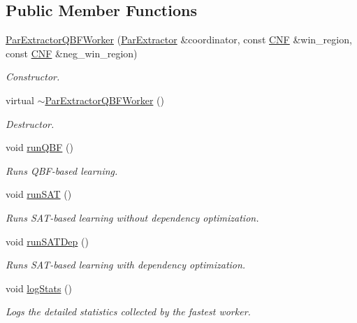 \subsection*{Public Member Functions}
\begin{DoxyCompactItemize}
\item 
\hyperlink{classParExtractorQBFWorker_a057b1cbecd64f78b61ef5fdcab78db68}{Par\-Extractor\-Q\-B\-F\-Worker} (\hyperlink{classParExtractor}{Par\-Extractor} \&coordinator, const \hyperlink{classCNF}{C\-N\-F} \&win\-\_\-region, const \hyperlink{classCNF}{C\-N\-F} \&neg\-\_\-win\-\_\-region)
\begin{DoxyCompactList}\small\item\em Constructor. \end{DoxyCompactList}\item 
virtual \hyperlink{classParExtractorQBFWorker_ae210ede58ebd23b30dd1e9a4d3501975}{$\sim$\-Par\-Extractor\-Q\-B\-F\-Worker} ()
\begin{DoxyCompactList}\small\item\em Destructor. \end{DoxyCompactList}\item 
void \hyperlink{classParExtractorQBFWorker_ad4537c098860650b4594cc71310d0373}{run\-Q\-B\-F} ()
\begin{DoxyCompactList}\small\item\em Runs Q\-B\-F-\/based learning. \end{DoxyCompactList}\item 
void \hyperlink{classParExtractorWorker_a58a6a251869b24e00b8b3dec0990feab}{run\-S\-A\-T} ()
\begin{DoxyCompactList}\small\item\em Runs S\-A\-T-\/based learning without dependency optimization. \end{DoxyCompactList}\item 
void \hyperlink{classParExtractorWorker_ae1d9c00159b3f4586f27f8493f558a5b}{run\-S\-A\-T\-Dep} ()
\begin{DoxyCompactList}\small\item\em Runs S\-A\-T-\/based learning with dependency optimization. \end{DoxyCompactList}\item 
void \hyperlink{classParExtractorWorker_aeea72a7e0c9562187c46223ddce4b65f}{log\-Stats} ()
\begin{DoxyCompactList}\small\item\em Logs the detailed statistics collected by the fastest worker. \end{DoxyCompactList}\end{DoxyCompactItemize}

